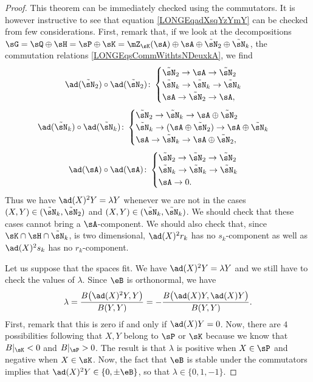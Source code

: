 \begin{proof}
	This theorem can be immediately checked using the commutators. It is however instructive to see that equation \eqref{LONGEqadXsqYzYmY} can be checked from few considerations. First, remark that, if we look at the decompositions $\sG=\sQ\oplus\sH=\sP\oplus\sK=\mZ_{\sK}(\sA)\oplus\sA\oplus\tilde\sN_2\oplus\tilde\sN_k$, the commutation relations \eqref{LONGEqsCommWithtsNDeuxkA}, we find
	\begin{equation}
		\ad(\tilde\sN_2)\circ\ad(\tilde\sN_2)\colon
		\begin{cases}
			\tilde\sN_2\to\sA\to\tilde\sN_2         \\
			\tilde\sN_k\to\tilde\sN_k\to\tilde\sN_k \\
			\sA\to\tilde\sN_2\to\sA,
		\end{cases}
	\end{equation}
	\begin{equation}
		\ad(\tilde\sN_k)\circ\ad(\tilde\sN_k)\colon
		\begin{cases}
			\tilde\sN_2\to\tilde\sN_k\to\sA\oplus\tilde\sN_2            \\
			\tilde\sN_k\to(\sA\oplus\tilde\sN_2)\to\sA\oplus\tilde\sN_k \\
			\sA\to\tilde\sN_k\to\sA\oplus\tilde\sN_2,
		\end{cases}
	\end{equation}
	\begin{equation}
		\ad(\sA)\circ\ad(\sA)\colon
		\begin{cases}
			\tilde\sN_2\to\tilde\sN_2\to\tilde\sN_2 \\
			\tilde\sN_k\to\tilde\sN_k\to\tilde\sN_k \\
			\sA\to 0.
		\end{cases}
	\end{equation}
	Thus we have $\ad(X)^2Y=\lambda Y$ whenever we are not in the cases $(X,Y)\in(\tilde\sN_k,\tilde\sN_2)$ and $(X,Y)\in(\tilde\sN_k,\tilde\sN_k)$. We should check that these cases cannot bring a $\sA$-component. We should also check that, since $\sK\cap\sH\cap\tilde\sN_k$, is two dimensional, $\ad(X)^2r_k$ has no $s_k$-component as well as $\ad(X)^2s_k$ has no $r_k$-component.

	Let us suppose that the spaces fit. We have $\ad(X)^2Y=\lambda Y$ and we still have to check the values of $\lambda$. Since $\eB$ is orthonormal, we have
	\begin{equation}
		\lambda=\frac{ B\big( \ad(X)^2Y,Y \big) }{ B(Y,Y) }=-\frac{ B\big( \ad(X)Y,\ad(X)Y \big) }{ B(Y,Y) }.
	\end{equation}
	First, remark that this is zero if and only if $\ad(X)Y=0$. Now, there are $4$ possibilities following that $X,Y$ belong to $\sP$ or $\sK$ because we know that $B|_{\sK}<0$ and $B|_{\sP}>0$. The result is that $\lambda$ is positive when $X\in\sP$ and negative when $X\in\sK$. Now, the fact that $\eB$ is stable under the commutators implies that $\ad(X)^2Y\in\{ 0,\pm \eB \}$, so that $\lambda\in\{ 0,1,-1 \}$.
\end{proof}
